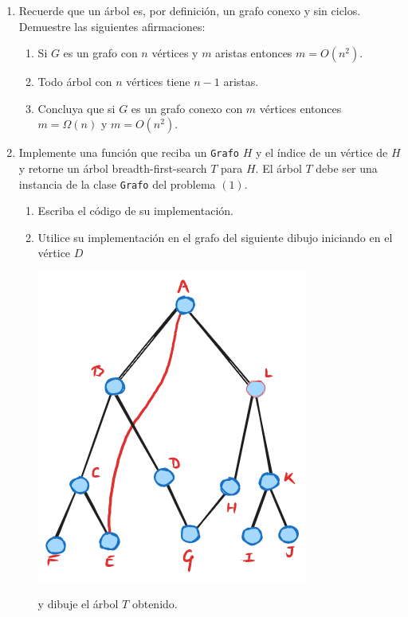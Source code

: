 \documentclass[12pt, a4paper]{article}
\begin{document}
\begin{enumerate}
\item{Recuerde que un \'arbol es, por definici\'on, un grafo conexo y sin ciclos. Demuestre las siguientes afirmaciones:
\begin{enumerate}
\item Si $G$ es un grafo con $n$ v\'ertices y $m$ aristas entonces $m=O(n^2)$.
\item Todo \'arbol con $n$ v\'ertices tiene $n-1$ aristas.
\item Concluya que si $G$ es un grafo conexo con $m$ v\'ertices entonces $m=\Omega(n)$ y $m=O(n^2)$.
\end{enumerate}
}


\item Implemente una funci\'on que reciba un \texttt{Grafo} $H$ y el \'indice de un v\'ertice de $H$ y retorne un árbol breadth-first-search $T$ para $H$. El árbol $T$ debe ser una instancia de la clase \texttt{Grafo} del problema $(1)$.

\begin{enumerate}
\item Escriba el c\'odigo de su implementaci\'on.
\item Utilice su implementaci\'on en el grafo del siguiente dibujo iniciando en el v\'ertice $D$ 
\begin{center}
\includegraphics[scale=0.5]{grafo_1.png}
\end{center}
y dibuje el \'arbol $T$ obtenido.
\end{enumerate}


\end{enumerate}
\end{document}
